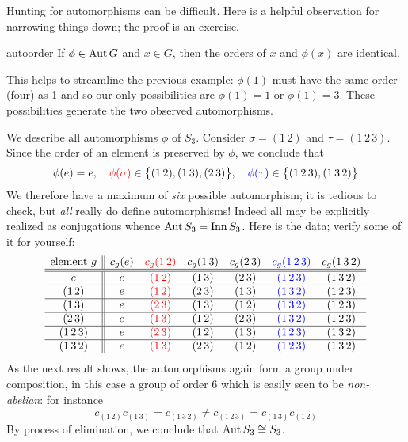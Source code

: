 Hunting for automorphisms can be difficult. Here is a helpful observation for narrowing things down; the proof is an exercise.

\begin{lemm}{}{autoorder}
	If $\phi\in\operatorname{Aut} G$ and $x\in G$, then the orders of $x$ and $\phi(x)$ are identical.
\end{lemm}

This helps to streamline the previous example: $\phi(1)$ must have the same order (four) as 1 and so our only possibilities are $\phi(1)=1$ or $\phi(1)=3$. These possibilities generate the two observed automorphisms.
% 

\goodbreak


\begin{example}{}{}
	We describe all automorphisms $\phi$ of $S_3$. Consider $\sigma=(1\,2)$ and $\tau=(1\,2\,3)$. Since the order of an element is preserved by $\phi$, we conclude that
  \[
  	\phi(e)=e,\quad 
  	\textcolor{red}{\phi(\sigma)}\in\bigl\{(1\,2),(1\,3),(2\,3)\bigr\},\quad 
  	\textcolor{blue}{\phi(\tau)}\in \bigl\{(1\,2\,3),(1\,3\,2)\bigr\}
 	\]
  We therefore have a maximum of \emph{six} possible automorphism; it is tedious to check, but \emph{all} really do define automorphisms! Indeed all may be explicitly realized as conjugations whence $\operatorname{Aut} S_3=\operatorname{Inn} S_3$. Here is the data; verify some of it for yourself:\vspace{-2pt}
  \[
	  \begin{array}{c||cccccc}
		  \text{element $g$}&c_g(e)&\textcolor{red}{c_g(1\,2)}&c_g(1\,3)&c_g(2\,3)&\textcolor{blue}{c_g(1\,2\,3)}&c_g(1\,3\,2)\\\hline\hline
		  e&e&\textcolor{red}{(1\,2)}&(1\,3)&(2\,3)&\textcolor{blue}{(1\,2\,3)}&(1\,3\,2)\\\hline
		  (1\,2)&e&\textcolor{red}{(1\,2)}&(2\,3)&(1\,3)&\textcolor{blue}{(1\,3\,2)}&(1\,2\,3)\\\hline
		  (1\,3)&e&\textcolor{red}{(2\,3)}&(1\,3)&(1\,2)&\textcolor{blue}{(1\,3\,2)}&(1\,2\,3)\\\hline
		  (2\,3)&e&\textcolor{red}{(1\,3)}&(1\,2)&(2\,3)&\textcolor{blue}{(1\,3\,2)}&(1\,2\,3)\\\hline
		  (1\,2\,3)&e&\textcolor{red}{(2\,3)}&(1\,2)&(1\,3)&\textcolor{blue}{(1\,2\,3)}&(1\,3\,2)\\\hline
		  (1\,3\,2)&e&\textcolor{red}{(1\,3)}&(2\,3)&(1\,2)&\textcolor{blue}{(1\,2\,3)}&(1\,3\,2)
	  \end{array}
  \]
  As the next result shows, the automorphisms again form a group under composition, in this case a group of order 6 which is easily seen to be \emph{non-abelian}: for instance 
  \[
  	c_{(1\,2)}c_{(1\,3)}= c_{(1\,3\,2)}\neq c_{(1\,2\,3)}= c_{(1\,3)}c_{(1\,2)}
  \]
  By process of elimination, we conclude that $\operatorname{Aut} S_3\cong S_3$.
\end{example}


